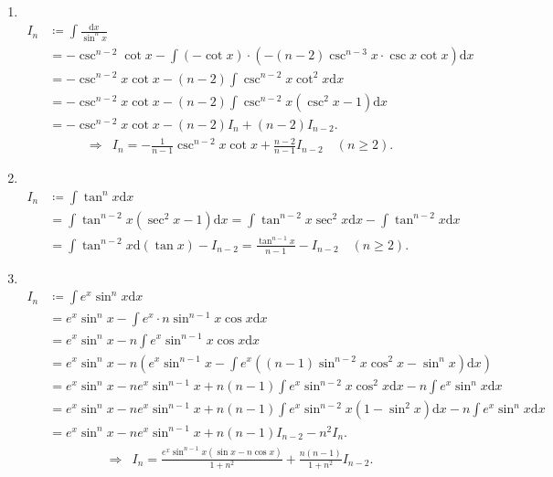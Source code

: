 \begin{solution}
\begin{enumerate}
    \item[4.]\\
    \[
    \begin{aligned}
    I_{n}&\coloneqq \int\frac{\mathrm{d}x}{\sin^n{x}}\\
    &=-\csc^{n-2}\cot{x}-\int\left(-\cot{x}\right)\cdot\left(-(n-2)\csc^{n-3}{x}\cdot\csc{x}\cot{x}\right)\mathrm{d}x\\
    &=-\csc^{n-2}{x}\cot{x}-(n-2)\int\csc^{n-2}{x}\cot^2{x}\mathrm{d}x\\
    &=-\csc^{n-2}{x}\cot{x}-(n-2)\int\csc^{n-2}{x}(\csc^2{x}-1)\mathrm{d}x\\
    &=-\csc^{n-2}{x}\cot{x}-(n-2)I_{n}+(n-2)I_{n-2}.
    \end{aligned}
    \]
    \[
    \begin{aligned}
    \Rightarrow &I_{n}=-\frac{1}{n-1}\csc^{n-2}{x}\cot{x}+\frac{n-2}{n-1}I_{n-2}\quad(n\geq 2).
    \end{aligned}
    \]

    \item[5.]\\
    \[
    \begin{aligned}
    I_{n}&\coloneqq\int\tan^n{x}\mathrm{d}x\\
    &=\int\tan^{n-2}{x}\left(\sec^2{x}-1\right)\mathrm{d}x=\int\tan^{n-2}{x}\sec^2{x}\mathrm{d}x-\int\tan^{n-2}{x}\mathrm{d}x\\
    &=\int\tan^{n-2}{x}\mathrm{d}(\tan{x})-I_{n-2}=\frac{\tan^{n-1}{x}}{n-1}-I_{n-2}\quad(n\geq 2).
    \end{aligned}
    \]

    \item[6.]\\
    \[
    \begin{aligned}
    I_{n}&\coloneqq\int e^x\sin^{n}{x}\mathrm{d}x\\
    &=e^x\sin^{n}{x}-\int e^x\cdot n\sin^{n-1}{x}\cos{x}\mathrm{d}x\\
    &=e^x\sin^{n}x-n\int e^x\sin^{n-1}{x}\cos{x}\mathrm{d}x\\
    &=e^x\sin^{n}x-n\left(e^x\sin^{n-1}{x}-\int e^x\left((n-1)\sin^{n-2}{x}\cos^2{x}-\sin^{n}{x}\right)\mathrm{d}x\right)\\
    &=e^x\sin^{n}x-ne^x\sin^{n-1}{x}+n(n-1)\int e^x\sin^{n-2}{x}\cos^2{x}\mathrm{d}x-n\int e^x\sin^{n}x\mathrm{d}x\\
    &=e^x\sin^{n}x-ne^x\sin^{n-1}{x}+n(n-1)\int e^x\sin^{n-2}{x}(1-\sin^2{x})\mathrm{d}x-n\int e^x\sin^{n}x\mathrm{d}x\\
    &=e^x\sin^{n}x-ne^x\sin^{n-1}{x}+n(n-1)I_{n-2}-n^2I_{n}.
    \end{aligned}
    \]
    \[
    \begin{aligned}
    \Rightarrow&I_{n}=\frac{e^x\sin^{n-1}{x}(\sin{x}-n\cos{x})}{1+n^2}+\frac{n(n-1)}{1+n^2}I_{n-2}.
    \end{aligned}
    \]


\end{enumerate}
\end{solution}
